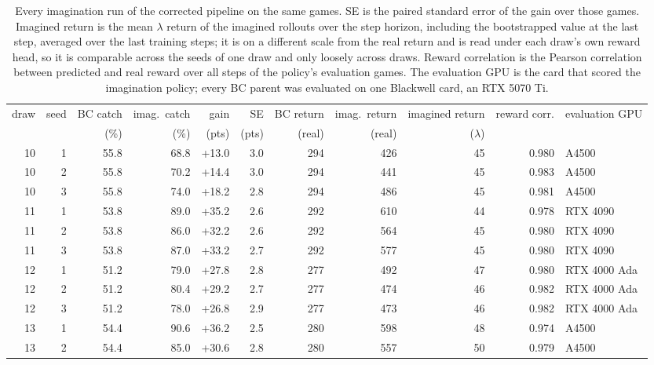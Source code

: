 \begin{table}[H]
\centering
\scriptsize
\caption{Every imagination run of the corrected pipeline on the same \nBoards games. SE is the paired standard error of the gain over those games. Imagined return is the mean $\lambda$ return of the imagined rollouts over the \horizon step horizon, including the bootstrapped value at the last step, averaged over the last \riseWindow training steps; it is on a different scale from the real return and is read under each draw's own reward head, so it is comparable across the seeds of one draw and only loosely across draws. Reward correlation is the Pearson correlation between predicted and real reward over all steps of the policy's evaluation games. The evaluation GPU is the card that scored the imagination policy; every BC parent was evaluated on one Blackwell card, an RTX 5070 Ti.}
\label{tab:runs_all}
\setlength{\tabcolsep}{3.2pt}
\begin{tabular}{@{}rrrrrrrrrrl@{}}
\toprule
draw & seed & BC catch & imag.\ catch & gain & SE & BC return & imag.\ return & imagined return & reward corr. & evaluation GPU \\
 & & (\%) & (\%) & (pts) & (pts) & (real) & (real) & ($\lambda$) & & \\
\midrule
10 & 1 & 55.8 & 68.8 & +13.0 & 3.0 & 294 & 426 & 45 & 0.980 & A4500 \\
10 & 2 & 55.8 & 70.2 & +14.4 & 3.0 & 294 & 441 & 45 & 0.983 & A4500 \\
10 & 3 & 55.8 & 74.0 & +18.2 & 2.8 & 294 & 486 & 45 & 0.981 & A4500 \\
11 & 1 & 53.8 & 89.0 & +35.2 & 2.6 & 292 & 610 & 44 & 0.978 & RTX 4090 \\
11 & 2 & 53.8 & 86.0 & +32.2 & 2.6 & 292 & 564 & 45 & 0.980 & RTX 4090 \\
11 & 3 & 53.8 & 87.0 & +33.2 & 2.7 & 292 & 577 & 45 & 0.980 & RTX 4090 \\
12 & 1 & 51.2 & 79.0 & +27.8 & 2.8 & 277 & 492 & 47 & 0.980 & RTX 4000 Ada \\
12 & 2 & 51.2 & 80.4 & +29.2 & 2.7 & 277 & 474 & 46 & 0.982 & RTX 4000 Ada \\
12 & 3 & 51.2 & 78.0 & +26.8 & 2.9 & 277 & 473 & 46 & 0.982 & RTX 4000 Ada \\
13 & 1 & 54.4 & 90.6 & +36.2 & 2.5 & 280 & 598 & 48 & 0.974 & A4500 \\
13 & 2 & 54.4 & 85.0 & +30.6 & 2.8 & 280 & 557 & 50 & 0.979 & A4500 \\

\end{tabular}
\end{table}
